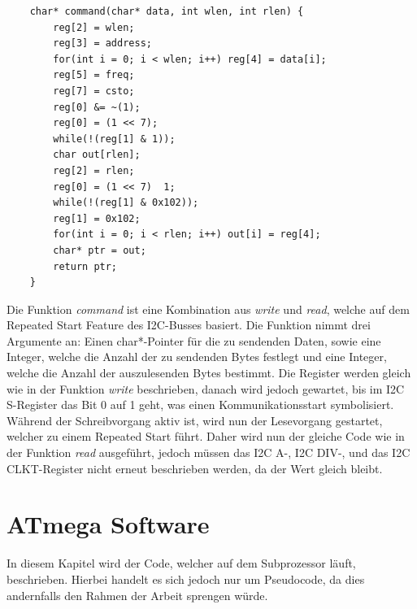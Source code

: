 \documentclass[12pt]{article}
\begin{document}
\begin{verbatim}
    char* command(char* data, int wlen, int rlen) {
        reg[2] = wlen;
        reg[3] = address;
        for(int i = 0; i < wlen; i++) reg[4] = data[i];
        reg[5] = freq;
        reg[7] = csto;
        reg[0] &= ~(1);
        reg[0] = (1 << 7);
        while(!(reg[1] & 1));
        char out[rlen];
        reg[2] = rlen;
        reg[0] = (1 << 7)  1;
        while(!(reg[1] & 0x102));
        reg[1] = 0x102;
        for(int i = 0; i < rlen; i++) out[i] = reg[4];
        char* ptr = out;
        return ptr;
    }
\end{verbatim}
\vspace{-2mm}
Die Funktion \textit{command} ist eine Kombination aus \textit{write} und \textit{read}, welche auf dem Repeated Start Feature des I2C-Busses basiert. Die Funktion nimmt drei Argumente an: Einen char*-Pointer für die zu sendenden Daten, sowie eine Integer, welche die Anzahl der zu sendenden Bytes festlegt und eine Integer, welche die Anzahl der auszulesenden Bytes bestimmt. Die Register werden gleich wie in der Funktion \textit{write} beschrieben, danach wird jedoch gewartet, bis im I2C S-Register das Bit 0 auf 1 geht, was einen Kommunikationsstart symbolisiert. Während der Schreibvorgang aktiv ist, wird nun der Lesevorgang gestartet, welcher zu einem Repeated Start führt. Daher wird nun der gleiche Code wie in der Funktion \textit{read} ausgeführt, jedoch müssen das I2C A-, I2C DIV-, und das I2C CLKT-Register nicht erneut beschrieben werden, da der Wert gleich bleibt. 
\newpage\section{ATmega Software}
In diesem Kapitel wird der Code, welcher auf dem Subprozessor läuft, beschrieben. Hierbei handelt es sich jedoch nur um Pseudocode, da dies andernfalls den Rahmen der Arbeit sprengen würde.
\end{document}
